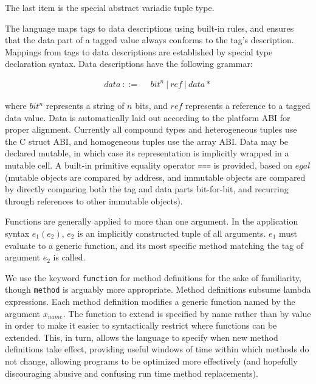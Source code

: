 \noindent
The last item is the special abstract variadic tuple type.

The language maps tags to data descriptions using built-in rules, and ensures that
the data part of a tagged value always conforms to the tag's description.
Mappings from tags to data descriptions are established by special type
declaration syntax.
Data descriptions have the following grammar:

\vspace{-3ex}
\begin{singlespace}
\begin{align*}
data\ ::=\ &\ bit^n\ |\ ref\ |\ data*
\end{align*}
\end{singlespace}

\noindent
where $bit^n$ represents a string of $n$ bits, and $ref$ represents a reference
to a tagged data value.
Data is automatically laid out according to the platform ABI for proper
alignment.
Currently all compound types and heterogeneous tuples use the C struct ABI, and
homogeneous tuples use the array ABI.
Data may be declared mutable, in which case its representation is implicitly
wrapped in a mutable cell.
A built-in primitive equality operator \texttt{===} is provided, based on
$egal$ \cite{egal} (mutable objects are compared by address, and immutable objects
are compared by directly comparing both the tag and data parts bit-for-bit, and
recurring through references to other immutable objects).

Functions are generally applied to more than one argument. In the application
syntax $e_1(e_2)$, $e_2$ is an implicitly constructed tuple of all arguments.
$e_1$ must evaluate to a generic function, and its most specific method
matching the tag of argument $e_2$ is called.

We use the keyword \texttt{function} for method definitions for the sake of
familiarity, though \texttt{method} is arguably more appropriate. Method
definitions subsume lambda expressions. Each method definition modifies a
generic function named by the argument $x_{name}$. The function to extend is
specified by name rather than by value in order to make it easier to syntactically
restrict where functions can be extended. This, in turn, allows the language to
specify when new method definitions take effect, providing useful windows of
time within which methods do not change, allowing programs to be optimized more
effectively (and hopefully discouraging abusive and confusing run time
method replacements).

